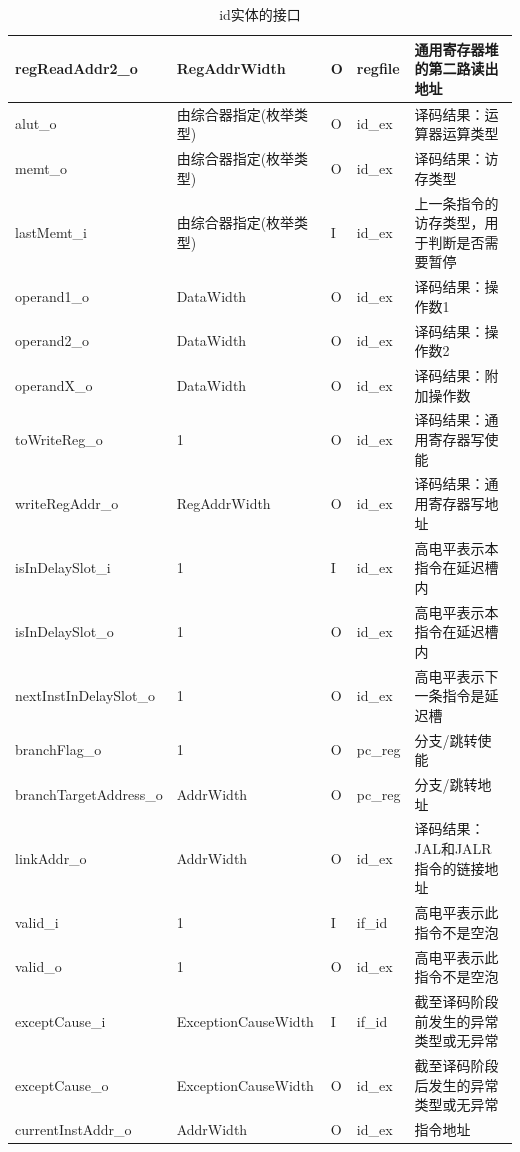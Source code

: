 \documentclass{article}
\begin{document}
\begin{spacing}{1.4}
\begin{table}[!htb]
\begin{center}
\begin{tabular*}{17cm}{l|l|l|l|p{5cm}}
\hline regReadAddr2\_o         & RegAddrWidth           & O     & regfile       & 通用寄存器堆的第二路读出地址 \\
\hline alut\_o                 & 由综合器指定(枚举类型) & O     & id\_ex        & 译码结果：运算器运算类型 \\
\hline memt\_o                 & 由综合器指定(枚举类型) & O     & id\_ex        & 译码结果：访存类型 \\
\hline lastMemt\_i             & 由综合器指定(枚举类型) & I     & id\_ex        & 上一条指令的访存类型，用于判断是否需要暂停 \\
\hline operand1\_o             & DataWidth              & O     & id\_ex        & 译码结果：操作数1 \\
\hline operand2\_o             & DataWidth              & O     & id\_ex        & 译码结果：操作数2 \\
\hline operandX\_o             & DataWidth              & O     & id\_ex        & 译码结果：附加操作数 \\
\hline toWriteReg\_o           & 1                      & O     & id\_ex        & 译码结果：通用寄存器写使能 \\
\hline writeRegAddr\_o         & RegAddrWidth           & O     & id\_ex        & 译码结果：通用寄存器写地址 \\
\hline isInDelaySlot\_i        & 1                      & I     & id\_ex        & 高电平表示本指令在延迟槽内 \\
\hline isInDelaySlot\_o        & 1                      & O     & id\_ex        & 高电平表示本指令在延迟槽内 \\
\hline nextInstInDelaySlot\_o  & 1                      & O     & id\_ex        & 高电平表示下一条指令是延迟槽 \\
\hline branchFlag\_o           & 1                      & O     & pc\_reg       & 分支/跳转使能 \\
\hline branchTargetAddress\_o  & AddrWidth              & O     & pc\_reg       & 分支/跳转地址 \\
\hline linkAddr\_o             & AddrWidth              & O     & id\_ex        & 译码结果：JAL和JALR指令的链接地址 \\
\hline valid\_i                & 1                      & I     & if\_id        & 高电平表示此指令不是空泡 \\
\hline valid\_o                & 1                      & O     & id\_ex        & 高电平表示此指令不是空泡 \\
\hline exceptCause\_i          & ExceptionCauseWidth    & I     & if\_id        & 截至译码阶段前发生的异常类型或无异常 \\
\hline exceptCause\_o          & ExceptionCauseWidth    & O     & id\_ex        & 截至译码阶段后发生的异常类型或无异常 \\
\hline currentInstAddr\_o      & AddrWidth              & O     & id\_ex        & 指令地址 \\
\hline
\end{tabular*}
\caption{id实体的接口}
\label{tb:id-interface}
\end{center}
\end{table}


\end{spacing}
\end{document}
